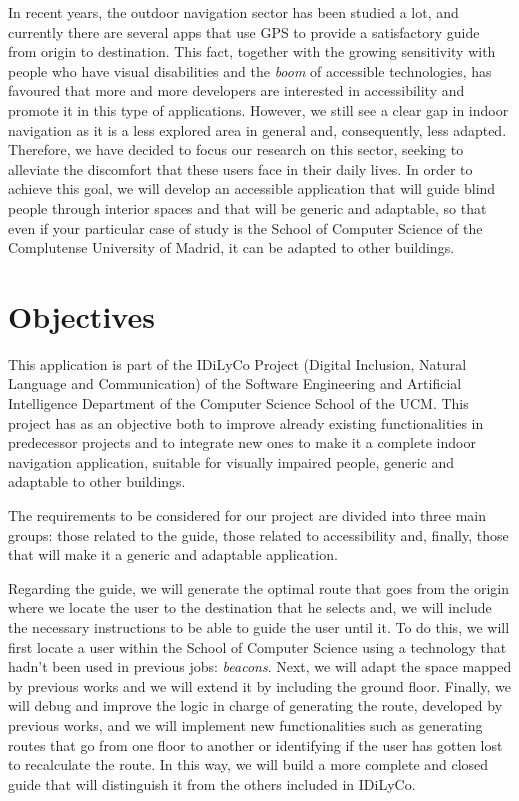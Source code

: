 In recent years, the outdoor navigation sector has been studied a lot, and currently there are several apps that use GPS to provide a satisfactory guide from origin to destination. This fact, together with the growing sensitivity with people who have visual disabilities and the \textit{boom} of accessible technologies, has favoured that more and more developers are interested in accessibility and promote it in this type of applications. However, we still see a clear gap in indoor navigation as it is a less explored area in general and, consequently, less adapted. Therefore, we have decided to focus our research on this sector, seeking to alleviate the discomfort that these users face in their daily lives. In order to achieve this goal, we will develop an accessible application that will guide blind people through interior spaces and that will be generic and adaptable, so that even if your particular case of study is the School of Computer Science of the Complutense University of Madrid, it can be adapted to other buildings. 


\section{Objectives}
\label{sec:objectives}
This application is part of the IDiLyCo Project (Digital Inclusion, Natural Language and Communication) of the
Software Engineering and Artificial Intelligence Department of the Computer Science School of the UCM. This project has
as an objective both to improve already existing functionalities in predecessor projects and to integrate new ones to make it a complete indoor navigation application, suitable for visually impaired people, generic and adaptable to other buildings.

The requirements to be considered for our project are divided into three main groups: those related to the guide, those related to accessibility and, finally, those that will make it a generic and adaptable application.

Regarding the guide, we will generate the optimal route that goes from the origin where we locate the user to the destination that he selects and, we will include the necessary instructions to be able to guide the user until it. To do this, we will first locate a user within the School of Computer Science using a technology that hadn't been used in previous jobs: \textit{beacons}. Next, we will adapt the space mapped by previous works and we will extend it by including the ground floor. Finally, we will debug and improve the logic in charge of generating the route, developed by previous works, and we will implement new functionalities such as generating routes that go from one floor to another or identifying if the user has gotten lost to recalculate the route. In this way, we will build a more complete and closed guide that will distinguish it from the others included in IDiLyCo.

